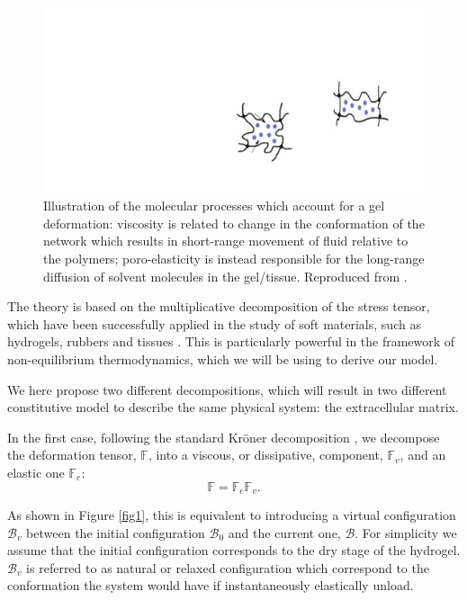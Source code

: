 \documentclass[12pt]{extarticle}
\newcommand{\F}{\ensuremath{\mathbb{F}}}
\begin{document}
\begin{figure}
	\centering
\includegraphics[scale=0.325]{images/visco_poro}
\caption{Illustration of the molecular processes which account for a gel deformation: viscosity is related to change in the conformation of the network which results in short-range movement of fluid relative to the polymers; poro-elasticity is instead responsible for the long-range diffusion of solvent molecules in the gel/tissue. Reproduced from \cite{viscoporo}.}
\end{figure}


The theory is based on the multiplicative decomposition of the stress tensor, which have been successfully applied in the study of soft materials, such as hydrogels, rubbers and tissues \cite{Article1, multdec,vol,magneto}. This is particularly powerful in the framework of non-equilibrium thermodynamics, which we will be using to derive our model. 

We here propose two different decompositions, which will result in two different constitutive model to describe the same physical system: the extracellular matrix.

In the first case, following the standard Kr\"{o}ner decomposition \cite{kro}, we decompose the deformation tensor, $\F$, into a viscous, or dissipative, component, $\F_v$, and an elastic one $\F_e$:
\begin{equation}
\F=\F_e\F_v.
\end{equation}

As shown in Figure \ref{fig1}, this is equivalent to introducing a virtual configuration $\mathcal{B}_v$ between the initial configuration $\mathcal{B}_0$ and the current one, $\mathcal{B}$. For simplicity we assume that the initial configuration corresponds to the dry stage of the hydrogel. $\mathcal{B}_v$ is referred to as natural or relaxed configuration which correspond to the conformation the system would have if instantaneously elastically unload.
\end{document}
